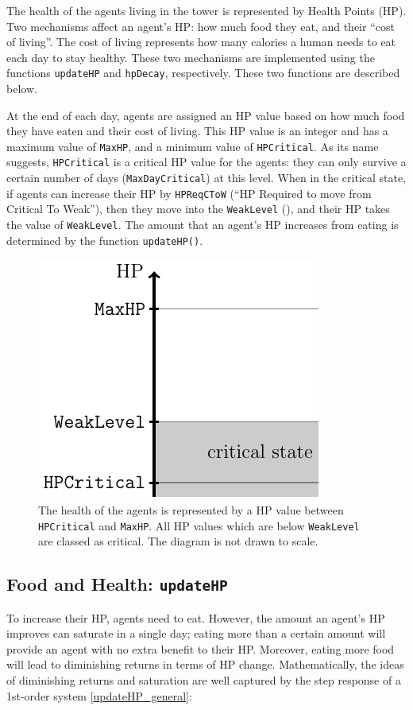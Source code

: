 The health of the agents living in the tower is represented by Health Points (HP). Two mechanisms affect an agent's HP: how much food they eat, and their ``cost of living''. The cost of living represents how many calories a human needs to eat each day to stay healthy. These two mechanisms are implemented using the functions \lstinline$updateHP$ and \lstinline$hpDecay$, respectively. These two functions are described below.

At the end of each day, agents are assigned an HP value based on how much food they have eaten and their cost of living. This HP value is an integer and has a maximum value of \lstinline$MaxHP$, and a minimum value of \lstinline$HPCritical$. As its name suggests, \lstinline$HPCritical$ is a critical HP value for the agents: they can only survive a certain number of days (\lstinline$MaxDayCritical$) at this level. When in the critical state, if agents can increase their HP by \lstinline$HPReqCToW$ (``HP Required to move from Critical To Weak''), then they move into the \lstinline$WeakLevel$ (), and their HP takes the value of \lstinline$WeakLevel$. The amount that an agent's HP increases from eating is determined by the function \lstinline$updateHP()$.

\begin{figure}[htb]
    \centering
    \includegraphics[width=0.3\linewidth]{002_simulation_structure/images/health_global.pdf}
    \caption{The health of the agents is represented by a HP value between \lstinline$HPCritical$ and \lstinline$MaxHP$. All HP values which are below \lstinline$WeakLevel$ are classed as critical. The diagram is not drawn to scale.}
    \label{fig:health_system}
\end{figure}

\subsection{Food and Health: \texorpdfstring{\texttt{updateHP}}{updateHP}}\label{updateHP}
To increase their HP, agents need to eat. However, the amount an agent's HP improves can saturate in a single day; eating more than a certain amount will provide an agent with no extra benefit to their HP. Moreover, eating more food will lead to diminishing returns in terms of HP change. Mathematically, the ideas of diminishing returns and saturation are well captured by the step response of a 1st-order system \eqref{updateHP_general}:


